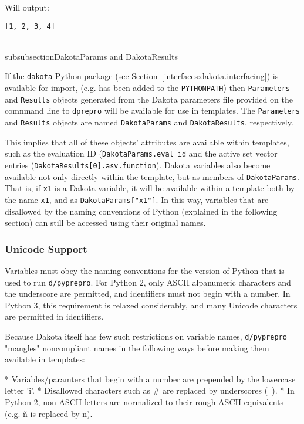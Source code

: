 Will output:

\begin{verbatim}
[1, 2, 3, 4]
\end{verbatim}

\\subsubsection{DakotaParams and DakotaResults}\label{interfaces:params-and-results}

If the \texttt{dakota} Python package (see 
Section~\ref{interfaces:dakota.interfacing}) is available for import, (e.g. has
been added to the \texttt{PYTHONPATH}) then \texttt{Parameters} and 
\texttt{Results} objects generated from the Dakota parameters file provided 
on the comnmand line to \texttt{dprepro} will be available for use in templates.
The \texttt{Parameters} and \texttt{Results} objects are named \texttt{DakotaParams} and
\texttt{DakotaResults}, respectively.

This implies that all of these objects' attributes are available within
templates, such as the evaluation ID (\texttt{DakotaParams.eval\_id} and the 
active set vector entries (\texttt{DakotaResults[0].asv.function}). Dakota 
variables also become available not only directly within the template, but as 
members of \texttt{DakotaParams}. That is, if  \texttt{x1} is a Dakota variable,
it will be available within a template both by the name \texttt{x1}, and as 
\texttt{DakotaParams["x1"]}. In this way, variables that are disallowed by the
naming conventions of Python (explained in the following section) can still
be accessed using their original names.

\subsubsection{Unicode Support}\label{interfaces:unicode}

Variables must obey the naming conventions for the version of Python that is
used to run \texttt{d/pyprepro}. For Python 2, only ASCII alpanumeric
characters and the underscore are permitted, and identifiers must not begin
with a number. In Python 3, this requirement is relaxed considerably, and
many Unicode characters are permitted in identifiers.

Because Dakota itself has few such restrictions on variable names,
\texttt{d/pyprepro} "mangles" noncompliant names in the following ways
before making them available in templates:

* Variables/paramters that begin with a number are prepended by the lowercase
letter 'i'.
* Disallowed characters such as # are replaced by underscores (\texttt{\_}).
* In Python 2, non-ASCII letters are normalized to their rough ASCII
equivalents (e.g. ñ is replaced by n).

